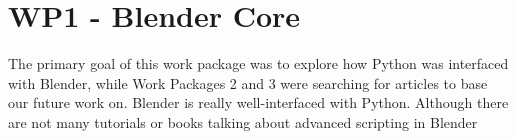 \section{WP1 - Blender Core}

The primary goal of this work package was to explore how Python was interfaced with Blender, while Work Packages 2 and 3 were searching for articles to base our future work on. Blender is really well-interfaced with Python. Although there are not many tutorials or books talking about advanced scripting in Blender 

